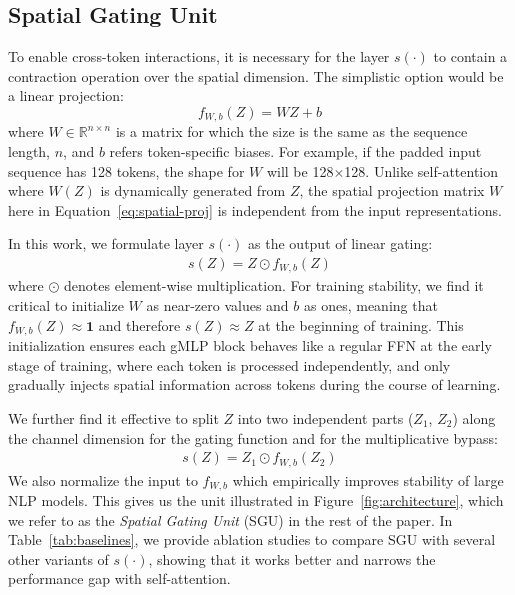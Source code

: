 \documentclass{article}
\newcommand{\gffn}{gMLP\xspace}
\begin{document}
\subsection{Spatial Gating Unit}
\label{subsec:spatial-interaction}
To enable cross-token interactions,
it is necessary for the layer $s(\cdot)$ to contain a contraction operation over the spatial dimension.
The simplistic option would be a linear projection:
\begin{equation}
f_{W, b}(Z) = WZ + b \label{eq:spatial-proj}
\end{equation}
where $W \in \mathbb{R}^{n \times n}$ is a matrix for which the size is the same as the sequence length, $n$, and $b$ refers token-specific biases.
For example, if the padded input sequence has 128 tokens,
the shape for $W$ will be 128$\times$128.
Unlike self-attention where $W(Z)$ is dynamically generated from $Z$,
the spatial projection matrix $W$ here in Equation~\eqref{eq:spatial-proj} is independent from the input representations.

In this work,
we formulate layer $s(\cdot)$ as the output of linear gating:
\begin{align}
    s(Z) = Z \odot f_{W, b}(Z) \label{eq:spatial-gating}
\end{align}
where $\odot$ denotes element-wise multiplication.
For training stability,
we find it critical to initialize $W$ as near-zero values and $b$ as ones,
meaning that $f_{W, b}(Z) \approx \mathbf{1}$ and therefore $s(Z) \approx Z$
at the beginning of training. This initialization ensures each \gffn block behaves like a regular FFN at the early stage of training, where each token is processed independently,
and only gradually injects spatial information across tokens during the course of learning.

We further find it effective to split $Z$ into two independent parts ($Z_1$, $Z_2$) along the channel dimension for the gating function and for the multiplicative bypass:
\begin{align}
    s(Z) = Z_1 \odot f_{W, b}(Z_2)  \label{eq:spatial-gating-independent}
\end{align}
We also normalize the input to $f_{W, b}$ which empirically improves stability of large NLP models.
This gives us the unit illustrated in Figure~\ref{fig:architecture}, which we refer to as the \emph{Spatial Gating Unit} (SGU) in the rest of the paper.
In Table~\ref{tab:baselines}, we provide ablation studies to compare SGU with several other variants of $s(\cdot)$,
showing that it works better and narrows the performance gap with self-attention.
\end{document}
